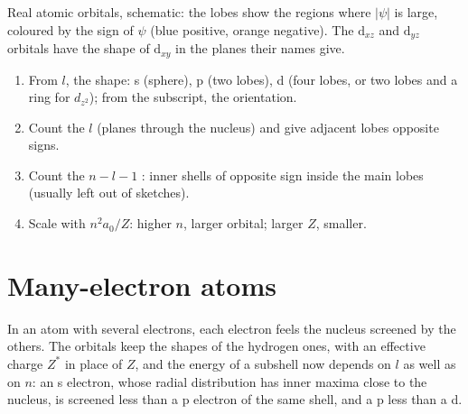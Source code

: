 \begin{omfigure}

{\small Real atomic orbitals, schematic: the lobes show the regions where $|\psi|$
is large, coloured by the sign of $\psi$ (blue positive, orange negative). The
$\mathrm d_{xz}$ and $\mathrm d_{yz}$ orbitals have the shape of $\mathrm d_{xy}$ in
the planes their names give.}
\end{omfigure}

\begin{method}\label{met:b2:atomic-orbitals:draw-orbital}
\begin{enumerate}
  \item From $l$, the shape: s (sphere), p (two lobes), d (four lobes, or two
        lobes and a ring for $d_{z^2}$); from the subscript, the orientation.
  \item Count the $l$  (planes through the nucleus) and give
        adjacent lobes opposite signs.
  \item Count the $n - l - 1$ : inner shells of opposite sign inside
        the main lobes (usually left out of sketches).
  \item Scale with $n^2a_0/Z$: higher $n$, larger orbital; larger $Z$, smaller.
\end{enumerate}
\end{method}

\section{Many-electron atoms}

In an atom with several electrons, each electron feels the nucleus screened by
the others. The orbitals keep the shapes of the hydrogen ones, with an effective
charge $Z^*$ in place of $Z$, and the energy of a subshell now depends on $l$ as
well as on $n$: an s electron, whose radial distribution has inner maxima close to
the nucleus, is screened less than a p electron of the same shell, and a p less
than a d.

